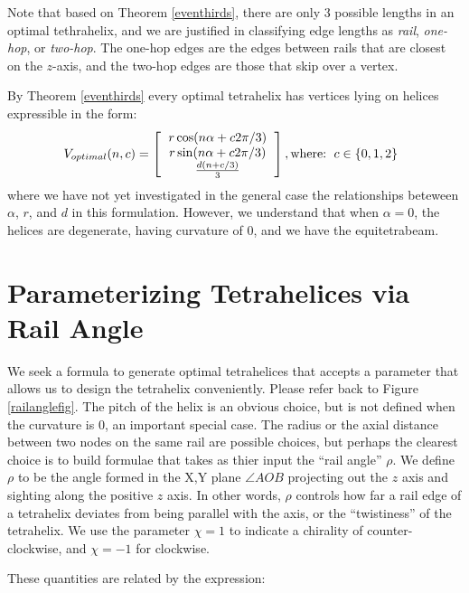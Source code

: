 \documentclass[11pt]{article}
\begin{document}
 Note that based on Theorem \ref{eventhirds}, there are only 3 possible lengths in an optimal tethrahelix,
 and we are justified in classifying edge lengths as \emph{rail}, \emph{one-hop}, or
\emph{two-hop}. The one-hop edges are the edges between rails that are closest on the $z$-axis, and the two-hop edges are those that skip over a vertex.

By Theorem \ref{eventhirds} every optimal tetrahelix has vertices lying on helices expressible in the form:
\[
V_{optimal}(n,c) =
\left [
  \begin{tabular}{c}
   $ r \cos(n \alpha +  c 2 \pi /3)$\\
   $ r \sin(n \alpha +  c 2 \pi /3) $\\
   $ \frac{d(n +c / 3)}{3}   $
  \end{tabular}
  \right ],
\text{where:}
\begin{tabular}{c}
  $c \in \{0,1,2\}$
  \end{tabular}      
\]
where we have not yet investigated in the general case the relationships beteween $\alpha$, $r$, and $d$ in this formulation.
However, we understand that when $\alpha = 0$, the helices are degenerate, having curvature of $0$, and
we have the equitetrabeam.




\section{Parameterizing Tetrahelices via Rail Angle}

We seek a formula to generate optimal tetrahelices that accepts a
parameter that allows us to design the tetrahelix conveniently.
Please refer back to Figure \ref{railanglefig}.
The pitch of the helix is an obvious choice, but is not defined when the
curvature is $0$, an important special case. The radius or the axial
distance between two nodes on the same rail are possible choices, but
perhaps the clearest choice is to build formulae that takes as thier
input the ``rail angle'' $\rho$. We define $\rho$ to be the angle
formed in the X,Y plane $\angle A O B$ projecting out the $z$
axis and sighting along the positive $z$ axis. In other words, $\rho$
controls how far a rail edge of a tetrahelix deviates from being
parallel with the axis, or the ``twistiness'' of the tetrahelix. We use
the parameter $\chi = 1$ to indicate a chirality of counter-clockwise,
and $\chi = -1$ for clockwise.



 These quantities are related by the expression:
\end{document}
